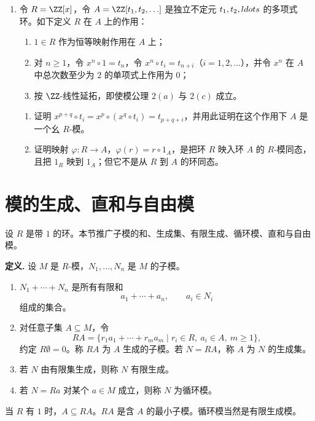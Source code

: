 \begin{enumerate}[label=\arabic*.]
	\item 令 $R=\ZZ[x]$，令 $A=\ZZ[t_1,t_2,\ldots]$ 是独立不定元 $t_1,t_2,\\ldots$ 的多项式环。如下定义 $R$ 在 $A$ 上的作用：
	\begin{enumerate}[label=\arabic*)]
		\item $1\in R$ 作为恒等映射作用在 $A$ 上；
		\item 对 $n\geq1$，令 $x^n\circ 1=t_n$，令 $x^n\circ t_i=t_{n+i}$（$i=1,2,\ldots$），并令 $x^n$ 在 $A$ 中总次数至少为 $2$ 的单项式上作用为 $0$；
		\item 按 $\ZZ$-线性延拓，即使模公理 $2(a)$ 与 $2(c)$ 成立。
	\end{enumerate}
	\begin{enumerate}[label=(\alph*)]
		\item 证明 $x^{p+q}\circ t_i=x^p\circ(x^q\circ t_i)=t_{p+q+i}$，并用此证明在这个作用下 $A$ 是一个幺 $R$-模。
		\item 证明映射 $\varphi:R\to A$，$\varphi(r)=r\circ1_A$，是把环 $R$ 映入环 $A$ 的 $R$-模同态，且把 $1_R$ 映到 $1_A$；但它不是从 $R$ 到 $A$ 的环同态。
	\end{enumerate}
\end{enumerate}


\section{模的生成、直和与自由模}

设 $R$ 是带 $1$ 的环。本节推广子模的和、生成集、有限生成、循环模、直和与自由模。


\noindent\textbf{定义.} 设 $M$ 是 $R$-模，$N_1,
\ldots,N_n$ 是 $M$ 的子模。
\begin{enumerate}[label=(\arabic*)]
	\item $N_1+
	\cdots+N_n$ 是所有有限和
	\[
	a_1+
	\cdots+a_n,
	\qquad a_i\in N_i
	\]
	组成的集合。
	\item 对任意子集 $A\subseteq M$，令
	\[
	RA=\{r_1a_1+
	\cdots+r_ma_m\mid r_i\in R,\ a_i\in A,\ m\geq1\},
	\]
	约定 $R\emptyset=0$。称 $RA$ 为 $A$ 生成的子模。若 $N=RA$，称 $A$ 为 $N$ 的生成集。
	\item 若 $N$ 由有限集生成，则称 $N$ 有限生成。
	\item 若 $N=Ra$ 对某个 $a\in M$ 成立，则称 $N$ 为循环模。
\end{enumerate}
当 $R$ 有 $1$ 时，$A\subseteq RA$。$RA$ 是含 $A$ 的最小子模。循环模当然是有限生成模。

